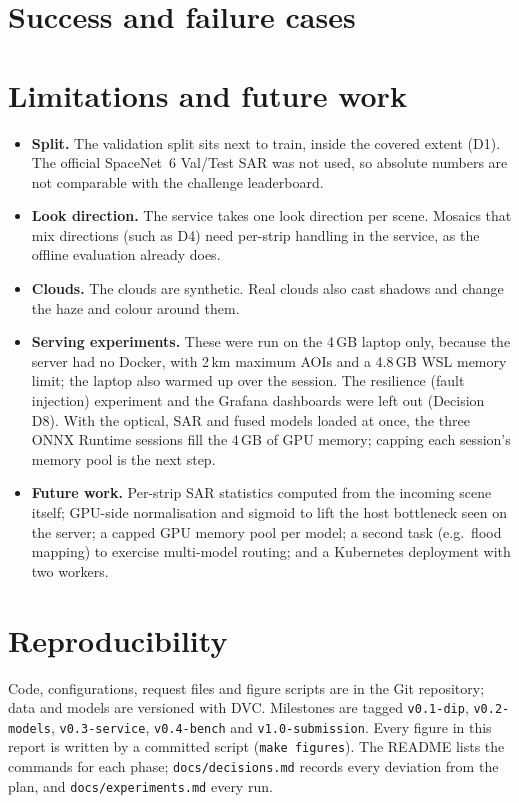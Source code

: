 \documentclass[11pt,a4paper]{article}
\begin{document}
\section{Success and failure cases}
\label{sec:cases}


\section{Limitations and future work}
\begin{itemize}
\item \textbf{Split.} The validation split sits next to train, inside the covered extent
(D1). The official SpaceNet~6 Val/Test SAR was not used, so absolute numbers are not
comparable with the challenge leaderboard.
\item \textbf{Look direction.} The service takes one look direction per scene. Mosaics that
mix directions (such as D4) need per-strip handling in the service, as the offline
evaluation already does.
\item \textbf{Clouds.} The clouds are synthetic. Real clouds also cast shadows and change
the haze and colour around them.
\item \textbf{Serving experiments.} These were run on the 4\,GB laptop only, because the
server had no Docker, with 2\,km maximum AOIs and a 4.8\,GB WSL memory limit; the laptop
also warmed up over the session. The resilience (fault injection) experiment and the
Grafana dashboards were left out (Decision D8). With the optical, SAR and fused models
loaded at once, the three ONNX Runtime sessions fill the 4\,GB of GPU memory; capping each
session's memory pool is the next step.
\item \textbf{Future work.} Per-strip SAR statistics computed from the incoming scene
itself; GPU-side normalisation and sigmoid to lift the host bottleneck seen on the server;
a capped GPU memory pool per model; a second task (e.g.\ flood mapping) to exercise
multi-model routing; and a Kubernetes deployment with two workers.
\end{itemize}

\section{Reproducibility}
Code, configurations, request files and figure scripts are in the Git repository; data and
models are versioned with DVC. Milestones are tagged \texttt{v0.1-dip}, \texttt{v0.2-models},
\texttt{v0.3-service}, \texttt{v0.4-bench} and \texttt{v1.0-submission}. Every figure in this
report is written by a committed script (\texttt{make figures}). The README lists the
commands for each phase; \texttt{docs/decisions.md} records every deviation from the plan,
and \texttt{docs/experiments.md} every run.
\end{document}
